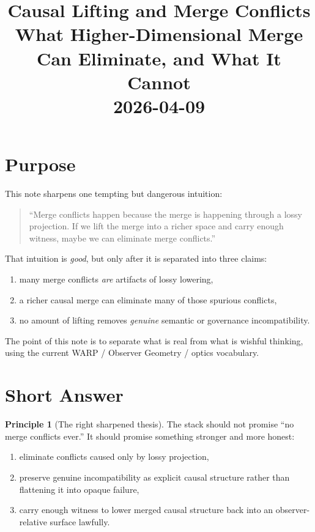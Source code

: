 \documentclass[11pt]{article}
\title{Causal Lifting and Merge Conflicts\\[6pt]
\large What Higher-Dimensional Merge Can Eliminate, and What It Cannot\\[3pt]
\normalsize 2026-04-09}
\author{}
\date{}
\theoremstyle{definition}
\newtheorem{principle}{Principle}
\begin{document}
\maketitle

\section{Purpose}

This note sharpens one tempting but dangerous intuition:

\begin{quote}
``Merge conflicts happen because the merge is happening through a lossy
projection. If we lift the merge into a richer space and carry enough witness,
maybe we can eliminate merge conflicts.''
\end{quote}

That intuition is \emph{good}, but only after it is separated into three
claims:
\begin{enumerate}[leftmargin=2em]
\item many merge conflicts \emph{are} artifacts of lossy lowering,
\item a richer causal merge can eliminate many of those spurious conflicts,
\item no amount of lifting removes \emph{genuine} semantic or governance
  incompatibility.
\end{enumerate}

The point of this note is to separate what is real from what is wishful
thinking, using the current WARP / Observer Geometry / optics vocabulary.

\section{Short Answer}

\begin{principle}[The right sharpened thesis]
The stack should not promise ``no merge conflicts ever.'' It should promise
something stronger and more honest:
\begin{enumerate}[leftmargin=2em]
\item eliminate conflicts caused only by lossy projection,
\item preserve genuine incompatibility as explicit causal structure rather than
  flattening it into opaque failure,
\item carry enough witness to lower merged causal structure back into an
  observer-relative surface lawfully.
\end{enumerate}
\end{principle}
\end{document}
